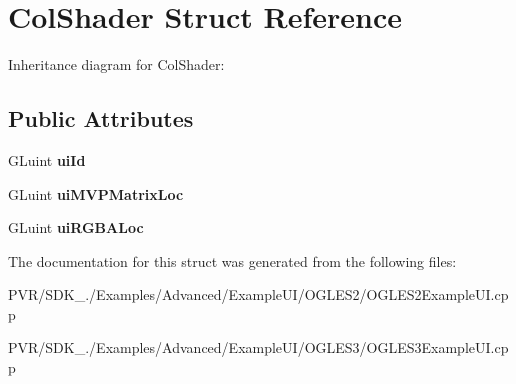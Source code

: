 \hypertarget{struct_col_shader}{\section{Col\+Shader Struct Reference}
\label{struct_col_shader}
}


Inheritance diagram for Col\+Shader\+:
\subsection*{Public Attributes}
\begin{DoxyCompactItemize}
\item 
\hypertarget{struct_col_shader_a468c70cc4c80defbdd8ba067a4a5872c}{G\+Luint {\bfseries ui\+Id}}\label{struct_col_shader_a468c70cc4c80defbdd8ba067a4a5872c}

\item 
\hypertarget{struct_col_shader_acbc22ae4f529f2d2239206e0e856388d}{G\+Luint {\bfseries ui\+M\+V\+P\+Matrix\+Loc}}\label{struct_col_shader_acbc22ae4f529f2d2239206e0e856388d}

\item 
\hypertarget{struct_col_shader_a2d4af9ec4a864e2a89a6482554ebdda9}{G\+Luint {\bfseries ui\+R\+G\+B\+A\+Loc}}\label{struct_col_shader_a2d4af9ec4a864e2a89a6482554ebdda9}

\end{DoxyCompactItemize}


The documentation for this struct was generated from the following files\+:\begin{DoxyCompactItemize}
\item 
P\+V\+R/\+S\+D\+K\+\_./\+Examples/\+Advanced/\+Example\+U\+I/\+O\+G\+L\+E\+S2/O\+G\+L\+E\+S2\+Example\+U\+I.\+cpp\item 
P\+V\+R/\+S\+D\+K\+\_./\+Examples/\+Advanced/\+Example\+U\+I/\+O\+G\+L\+E\+S3/O\+G\+L\+E\+S3\+Example\+U\+I.\+cpp\end{DoxyCompactItemize}
